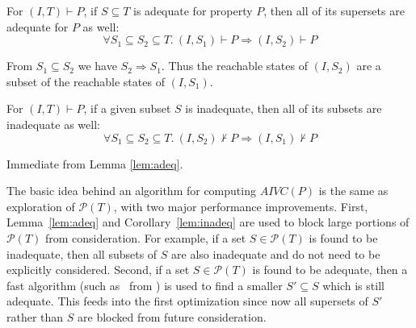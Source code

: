 
\begin{lemma}
\label{lem:adeq}
For $(I, T) \vdash P$, if $S \subseteq T$ is adequate for property $P$, then all of its supersets are adequate for $P$ as well:
\allowbreak $$\forall S_1 \subseteq S_2 \subseteq T.~ (I, S_1) \vdash P \Rightarrow (I, S_2) \vdash P$$
\end{lemma}
\begin{IEEEproof}
From $S_1 \subseteq S_2$ we have $S_2 \Rightarrow S_1$. Thus the
  reachable states of $(I, S_2)$ are a subset of the reachable states
  of $(I, S_1)$.
\end{IEEEproof}

\begin{corollary}
\label{lem:inadeq}
For $(I, T) \vdash P$, if a given subset $S$ is inadequate, then all of its subsets are inadequate as well:
\allowbreak $$\forall S_1 \subseteq S_2 \subseteq T.~ (I, S_2) \nvdash P \Rightarrow (I, S_1) \nvdash P$$
\end{corollary}
\begin{IEEEproof}
  Immediate from Lemma \ref{lem:adeq}.
\end{IEEEproof}


The basic idea behind an algorithm for computing $AIVC(P)$ is the same
as exploration of $\mathcal{P}(T)$, with two major performance
improvements. First, Lemma~\ref{lem:adeq} and
Corollary~\ref{lem:inadeq} are used to block large portions of
$\mathcal{P}(T)$ from consideration. For example, if a set $S \in
\mathcal{P}(T)$ is found to be inadequate, then all subsets of $S$ are
also inadequate and do not need to be explicitly considered. Second,
if a set $S \in \mathcal{P}(T)$ is found to be adequate, then a fast
algorithm (such as \ucalg\ from \cite{Ghass16}) is used to find a
smaller $S' \subseteq S$ which is still adequate. This feeds into the
first optimization since now all supersets of $S'$ rather than $S$ are
blocked from future consideration.

